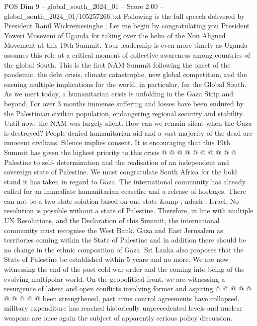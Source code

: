 \begin{textsample}{POS Dim 9 – global\_south\_2024\_01 – Score 2.00 – global\_south\_2024\_01/105257266.txt}  \label{ex:f9_pos_017}
Following is the full speech delivered by President Ranil Wickremesinghe ; Let me begin by congratulating you President Yoweri Museveni of Uganda for taking over the helm of the Non Aligned Movement at this 19th Summit.
Your leadership is even more timely as Uganda assumes this role at a critical moment of collective awareness among countries of the global South.
This is the first NAM Summit following the onset of the pandemic, the debt crisis, climate catastrophe, new global competition, and the ensuing multiple implications for the world, in particular, for the Global South.
As we meet today, a humanitarian crisis is unfolding in the Gaza Strip and beyond.
For over 3 months immense suffering and losses have been endured by the Palestinian civilian population, endangering regional security and stability.
Until now, the NAM was largely silent.
How can we remain silent when the Gaza is destroyed?
People denied humanitarian aid and a vast majority of the dead are innocent civilians.
Silence implies consent.
It is encouraging that this 19th Summit has given the highest priority to this crisis @ @ @ @ @ @ @ @ @ @ Palestine to self- determination and the realisation of an independent and sovereign state of Palestine.
We must congratulate South Africa for the bold stand it has taken in regard to Gaza.
The international community has already called for an immediate humanitarian ceasefire and a release of hostages.
There can not be a two state solution based on one state \&amp ; ndash ; Israel.
No resolution is possible without a state of Palestine.
Therefore, in line with multiple UN Resolutions, and the Declaration of this Summit, the international community must recognise the West Bank, Gaza and East Jerusalem as territories coming within the State of Palestine and in addition there should be no change in the ethnic composition of Gaza.
Sri Lanka also proposes that the State of Palestine be established within 5 years and no more.
We are now witnessing the end of the post cold war order and the coming into being of the evolving multipolar world.
On the geopolitical front, we are witnessing a resurgence of latent and open conflicts involving former and aspiring @ @ @ @ @ @ @ @ @ @ been strengthened, past arms control agreements have collapsed, military expenditure has reached historically unprecedented levels and nuclear weapons are once again the subject of apparently serious policy discussion.

\end{textsample}
